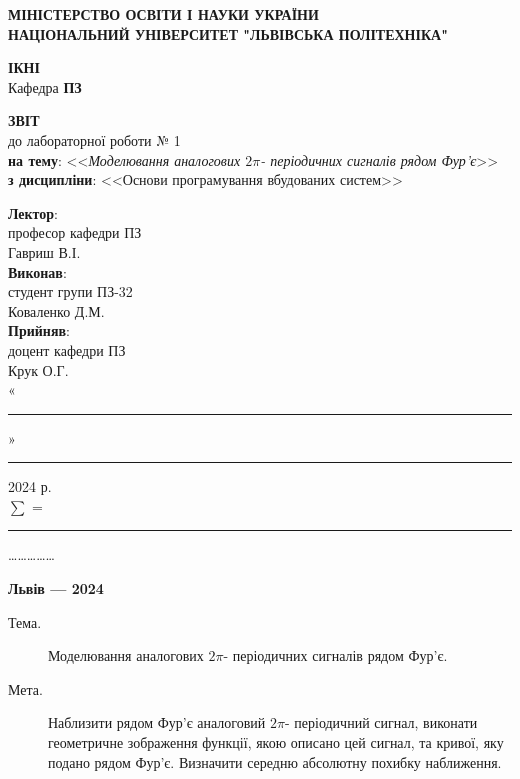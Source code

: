 \documentclass[oneside,14pt]{extarticle}
\newcommand\subject{Основи програмування вбудованих систем}
\newcommand\lecturer{професор кафедри ПЗ\\Гавриш В.І.}
\newcommand\teacher{доцент кафедри ПЗ\\Крук О.Г.}
\newcommand\mygroup{ПЗ-32}
\newcommand\lab{1}
\newcommand\theme{Моделювання аналогових $2\pi$- періодичних сигналів рядом Фур’є}
\newcommand\purpose{Наблизити рядом Фур’є аналоговий $2\pi$- періодичний
	сигнал, виконати геометричне зображення функції, якою описано цей сигнал, та
	кривої, яку подано рядом Фур’є. Визначити середню абсолютну похибку
	наближення}
\begin{document}
\begin{normalsize}
	\begin{titlepage}
		\thispagestyle{empty}
		\begin{center}
			\textbf{МІНІСТЕРСТВО ОСВІТИ І НАУКИ УКРАЇНИ\\
				НАЦІОНАЛЬНИЙ УНІВЕРСИТЕТ "ЛЬВІВСЬКА ПОЛІТЕХНІКА"}
		\end{center}
		\begin{flushright}
			\textbf{ІКНІ}\\
			Кафедра \textbf{ПЗ}
		\end{flushright}
		\vspace{80pt}
		\begin{center}
			\textbf{ЗВІТ}\\
			\vspace{10pt}
			до лабораторної роботи № \lab\\
			\textbf{на тему}: <<\textit{\theme}>>\\
			\textbf{з дисципліни}: <<\subject>>
		\end{center}
		\vspace{80pt}
		\begin{flushright}
			
			\textbf{Лектор}:\\
			\lecturer\\
			\vspace{28pt}
			\textbf{Виконав}:\\
			
			студент групи \mygroup\\
			Коваленко Д.М.\\
			\vspace{28pt}
			\textbf{Прийняв}:\\
			
			\teacher\\
			
			\vspace{28pt}
			«\rule{1cm}{0.15mm}» \rule{1.5cm}{0.15mm} 2024 р.\\
			$\sum$ = \rule{1cm}{0.15mm}……………\\
			
		\end{flushright}
		\vspace{\fill}
		\begin{center}
			\textbf{Львів — 2024}
		\end{center}
	\end{titlepage}
		
	\begin{description}
		\item[Тема.] \theme.
		\item[Мета.] \purpose.
	\end{description}


\end{normalsize}
\end{document}
